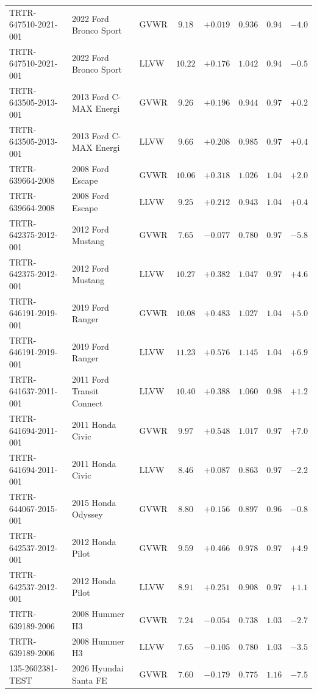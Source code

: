 \documentclass[12pt, twoside]{amsart}
\theoremstyle{definition}
\begin{document}
{\begin{longtable}{lp{2.9cm}lccccc}
TRTR-647510-2021-001 & 2022 Ford Bronco Sport & GVWR & $9.18$ & $+0.019$ & $0.936$ & $0.94$ & $-4.0$\\
TRTR-647510-2021-001 & 2022 Ford Bronco Sport & LLVW & $10.22$ & $+0.176$ & $1.042$ & $0.94$ & $-0.5$\\
TRTR-643505-2013-001 & 2013 Ford C-MAX Energi & GVWR & $9.26$ & $+0.196$ & $0.944$ & $0.97$ & $+0.2$\\
TRTR-643505-2013-001 & 2013 Ford C-MAX Energi & LLVW & $9.66$ & $+0.208$ & $0.985$ & $0.97$ & $+0.4$\\
TRTR-639664-2008 & 2008 Ford Escape & GVWR & $10.06$ & $+0.318$ & $1.026$ & $1.04$ & $+2.0$\\
TRTR-639664-2008 & 2008 Ford Escape & LLVW & $9.25$ & $+0.212$ & $0.943$ & $1.04$ & $+0.4$\\
TRTR-642375-2012-001 & 2012 Ford Mustang & GVWR & $7.65$ & $-0.077$ & $0.780$ & $0.97$ & $-5.8$\\
TRTR-642375-2012-001 & 2012 Ford Mustang & LLVW & $10.27$ & $+0.382$ & $1.047$ & $0.97$ & $+4.6$\\
TRTR-646191-2019-001 & 2019 Ford Ranger & GVWR & $10.08$ & $+0.483$ & $1.027$ & $1.04$ & $+5.0$\\
TRTR-646191-2019-001 & 2019 Ford Ranger & LLVW & $11.23$ & $+0.576$ & $1.145$ & $1.04$ & $+6.9$\\
TRTR-641637-2011-001 & 2011 Ford Transit Connect & LLVW & $10.40$ & $+0.388$ & $1.060$ & $0.98$ & $+1.2$\\
TRTR-641694-2011-001 & 2011 Honda Civic & GVWR & $9.97$ & $+0.548$ & $1.017$ & $0.97$ & $+7.0$\\
TRTR-641694-2011-001 & 2011 Honda Civic & LLVW & $8.46$ & $+0.087$ & $0.863$ & $0.97$ & $-2.2$\\
TRTR-644067-2015-001 & 2015 Honda Odyssey & GVWR & $8.80$ & $+0.156$ & $0.897$ & $0.96$ & $-0.8$\\
TRTR-642537-2012-001 & 2012 Honda Pilot & GVWR & $9.59$ & $+0.466$ & $0.978$ & $0.97$ & $+4.9$\\
TRTR-642537-2012-001 & 2012 Honda Pilot & LLVW & $8.91$ & $+0.251$ & $0.908$ & $0.97$ & $+1.1$\\
TRTR-639189-2006 & 2008 Hummer H3 & GVWR & $7.24$ & $-0.054$ & $0.738$ & $1.03$ & $-2.7$\\
TRTR-639189-2006 & 2008 Hummer H3 & LLVW & $7.65$ & $-0.105$ & $0.780$ & $1.03$ & $-3.5$\\
135-2602381-TEST & 2026 Hyundai Santa FE & GVWR & $7.60$ & $-0.179$ & $0.775$ & $1.16$ & $-7.5$\\

\end{longtable}}
\end{document}
